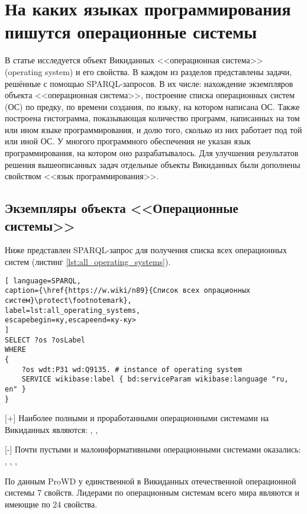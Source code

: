 \chapter{На каких языках программирования пишутся операционные системы}
\label{ch:operating-sysmets}

В статье исследуется объект Викиданных <<операционная система>> (operating system) и его свойства. В каждом из разделов представлены задачи, решённые с помощью SPARQL-запросов. В их числе: нахождение экземпляров объекта <<операционная система>>, построение списка операционных систем (ОС) по предку, по времени создания, по языку, на котором написана ОС. Также построена гистограмма, показывающая количество программ, написанных на том или ином языке программирования, и долю того, сколько из них работает под той или иной ОС. У многого программного обеспечения не указан язык программирования, на котором оно разрабатывалось. Для улучшения результатов решения вышеописанных задач отдельные объекты Викиданных были дополнены свойством <<язык программирования>>.


\section{Экземпляры объекта <<Операционные системы>>}
Ниже представлен SPARQL-запрос для получения списка всех операционных систем (листинг \ref{lst:all_operating_systems}).

\begin{lstlisting}[ language=SPARQL, 
caption={\href{https://w.wiki/n89}{Список всех опрационных систем}\protect\footnotemark},
label=lst:all_operating_systems, 
escapebegin=ку,escapeend=ку-ку>
]
SELECT ?os ?osLabel
WHERE
{
	?os wdt:P31 wd:Q9135. # instance of operating system
	SERVICE wikibase:label { bd:serviceParam wikibase:language "ru, en" }
}
\end{lstlisting}

[+] Наиболее полными и проработанными операционными системами на Викиданных являются: , , 

[-] Почти пустыми и малоинформативными операционными системами оказались: , , , 

По данным ProWD у единственной в Викиданных отечественной операционной системы  7 свойств. Лидерами по операционным системам всего мира являются  и  имеющие по 24 свойства.


